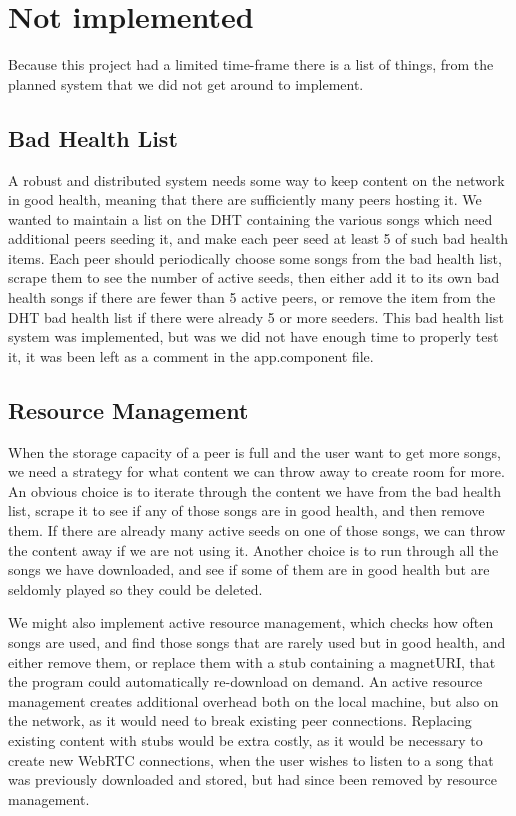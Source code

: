 \section{Not implemented}
\label{sec:not-implemented}
Because this project had a limited time-frame there is a list of things, from
the planned system that we did not get around to implement.

\subsection{Bad Health List}
A robust and distributed system needs some way to keep content on the network in good health,
meaning that there are sufficiently many peers hosting it.
We wanted to maintain a list on the DHT containing the various songs which need additional peers seeding it,
and make each peer seed at least 5 of such bad health items.
Each peer should periodically choose some songs from the bad health list,
scrape them to see the number of active seeds, 
then either add it to its own bad health songs if there are fewer than 5 active peers,
or remove the item from the DHT bad health list if there were already 5 or more seeders.
This bad health list system was implemented, but was we did not have enough time to properly test it,
it was been left as a comment in the app.component file.

\subsection{Resource Management}
When the storage capacity of a peer is full and the user want to get more songs,
we need a strategy for what content we can throw away to create room for more.
An obvious choice is to iterate through the content we have from the bad health list,
scrape it to see if any of those songs are in good health,
and then remove them.
If there are already many active seeds on one of those songs,
we can throw the content away if we are not using it.
Another choice is to run through all the songs we have downloaded,
and see if some of them are in good health but are seldomly played so they could be deleted.

We might also implement active resource management, which checks how often songs are used,
and find those songs that are rarely used but in good health, and either remove them,
or replace them with a stub containing a magnetURI, 
that the program could automatically re-download on demand.
An active resource management creates additional overhead both on the local machine,
but also on the network, as it would need to break existing peer connections.
Replacing existing content with stubs would be extra costly,
as it would be necessary to create new WebRTC connections,
when the user wishes to listen to a song that was previously downloaded and stored,
but had since been removed by resource management.

